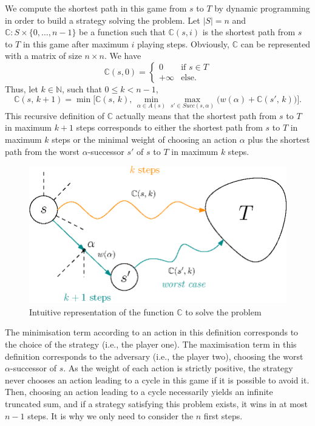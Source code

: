 We compute the shortest path in this game from $s$ to $T$ by dynamic programming in order to build a strategy solving the \SPG{} problem.
Let $|S| = n$ and $\mathbb{C}: S \times \{0, \dots, n-1 \}$ be a function such that $\mathbb{C}(s, i)$ is the shortest path from $s$ to $T$ in this game after maximum
$i$ playing steps.
Obviously, $\mathbb{C}$ can be represented with a matrix of size $n \times n$.
We have \[\mathbb{C}(s, 0) = \begin{cases}
  0 & \text{if } s \in T\\
  +\infty & \text{else}.
\end{cases}\]
Thus, let $k \in \mathbb{N}$, such that $0 \leq k < n - 1$,
\[
  \mathbb{C}(s,\, k+1) = \min \big[\mathbb{C}(s,\, k),\, \min_{\alpha \in A(s)} \max_{s' \in Succ(s,\alpha)} \big(w(\alpha) + \mathbb{C}(s',\, k)\big)\big].
\]
This recursive definition of $\mathbb{C}$ actually means that the shortest path from $s$ to $T$ in maximum $k+1$ steps corresponds to either the shortest path from $s$ to $T$ in maximum $k$ steps or the minimal weight of choosing an action $\alpha$ plus the shortest path from the worst $\alpha$-successor $s'$ of $s$ to $T$ in maximum $k$ steps.
\begin{figure}[h]
  \centering
  \includegraphics[width=0.6\linewidth]{resources/sp-g}
  \captionsetup{justification=centering}
  \caption{Intuitive representation of  the function $\mathbb{C}$ to solve the \SPG{} problem}
\end{figure}
The minimisation term according to an action in this definition corresponds to the choice of the strategy (i.e., the player one).
The maximisation term in this definition corresponds to the adversary (i.e., the player two), choosing the worst $\alpha$-successor of $s$.
As the weight of each action is strictly positive, the strategy never chooses an action leading to a cycle in this game if it is possible to avoid it.
Then, choosing an action leading to a cycle necessarily yields an infinite truncated sum, and if a strategy satisfying this problem exists, it wins in at most $n - 1$ steps. It is why we only need to consider the $n$ first steps.


